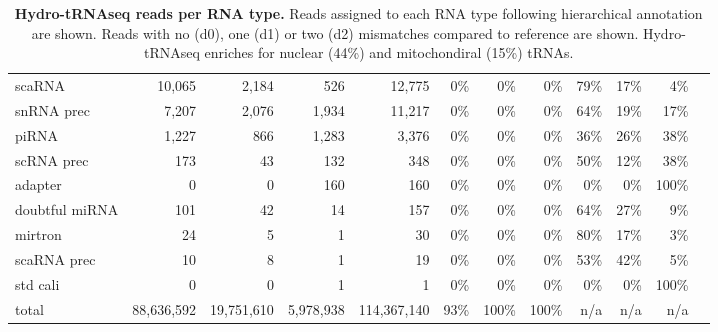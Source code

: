\documentclass[12pt]{rockefeller}
\begin{document}
\begin{table}[h!]
\begin{adjustbox}{max width = \textwidth}
\begin{tabular}{|l|r|r|r|r|r|r|r|r|r|r|r}
         scaRNA &      10,065 &       2,184 &        526 &       12,775 &                0\% &                   0\% &             0\% &                 79\% &      17\% &       4\% \\
     snRNA prec &       7,207 &       2,076 &      1,934 &       11,217 &                0\% &                   0\% &             0\% &                 64\% &      19\% &      17\% \\
          piRNA &       1,227 &         866 &      1,283 &        3,376 &                0\% &                   0\% &             0\% &                 36\% &      26\% &      38\% \\
     scRNA prec &         173 &          43 &        132 &          348 &                0\% &                   0\% &             0\% &                 50\% &      12\% &      38\% \\
        adapter &           0 &           0 &        160 &          160 &                0\% &                   0\% &             0\% &                  0\% &       0\% &     100\% \\
 doubtful miRNA &         101 &          42 &         14 &          157 &                0\% &                   0\% &             0\% &                 64\% &      27\% &       9\% \\
        mirtron &          24 &           5 &          1 &           30 &                0\% &                   0\% &             0\% &                 80\% &      17\% &       3\% \\
    scaRNA prec &          10 &           8 &          1 &           19 &                0\% &                   0\% &             0\% &                 53\% &      42\% &       5\% \\
       std cali &           0 &           0 &          1 &            1 &                0\% &                   0\% &             0\% &                  0\% &       0\% &     100\% \\ \hline
         total  &  88,636,592 &  19,751,610 &  5,978,938 &  114,367,140 &               93\% &                 100\% &           100\% &                 n/a &      n/a &      n/a \\
\hline
  \end{tabular}
  \end{adjustbox}
\caption[Hydro-tRNAseq reads per RNA type]{\textbf{Hydro-tRNAseq reads per RNA type.} Reads assigned to each RNA type following hierarchical annotation are shown. Reads with no (d0), one (d1) or two (d2) mismatches compared to reference are shown. Hydro-tRNAseq enriches for nuclear (44\%) and mitochondiral (15\%) tRNAs.}\label{tableS1}
\end{table}
\end{document}
